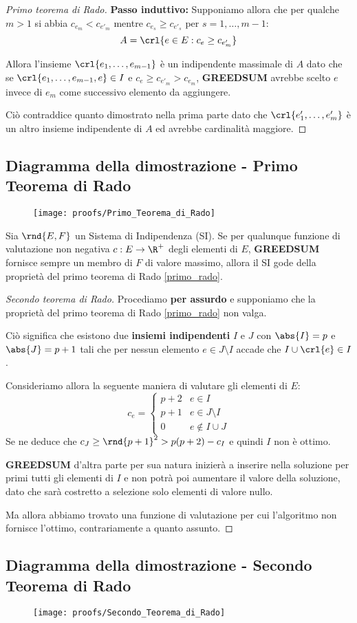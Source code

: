 \documentclass[\main/main.tex]{subfiles}
\begin{document}
\begin{proof}[Primo teorema di Rado]
  \textbf{Passo induttivo:} Supponiamo allora che per qualche \(m>1\) si abbia \(c_{e_m} < c_{e'_m}\) mentre \(c_{e_s} \geq c_{e'_s}\) per \(s = 1, \ldots, m-1\):
  \[A = \crl{e \in E: c_{e} \geq c_{e'_m}}\]

  Allora l'insieme \(\crl{e_1, \ldots, e_{m-1}}\) è un indipendente massimale di \(A\) dato che se \(\crl{e_1, \ldots, e_{m-1}, e} \in I\) e \(c_{e} \geq c_{e'_m} > c_{e_m}\), \textbf{GREEDSUM} avrebbe scelto \(e\) invece di \(e_m\) come successivo elemento da aggiungere.

  Ciò contraddice quanto dimostrato nella prima parte dato che \(\crl{e'_1, \ldots, e'_m}\) è un altro insieme indipendente di \(A\) ed avrebbe cardinalità maggiore.
\end{proof}
\clearpage
\subsection{Diagramma della dimostrazione - Primo Teorema di Rado}
\begin{figure}
  \texttt{[image: proofs/Primo\_Teorema\_di\_Rado]}
\end{figure}
\clearpage
\begin{theorem}
  Sia \(\rnd{E, F}\) un Sistema di Indipendenza (SI). Se per qualunque funzione di valutazione non negativa \(c: E \rightarrow \R^+\) degli elementi di \(E\), \textbf{GREEDSUM} fornisce sempre un membro di \(F\) di valore massimo, allora il SI gode della proprietà del primo teorema di Rado \ref{primo_rado}.
\end{theorem}
\begin{proof}[Secondo teorema di Rado]
  Procediamo \textbf{per assurdo} e supponiamo che la proprietà del primo teorema di Rado \ref{primo_rado} non valga.

  Ciò significa che esistono due \textbf{insiemi indipendenti} \(I\) e \(J\) con \(\abs{I} = p\) e \(\abs{J} = p+1\) tali che per nessun elemento \(e \in J \setminus I\) accade che \(I \cup \crl{e} \in I\).

  Consideriamo allora la seguente maniera di valutare gli elementi di \(E\):
  \[
    c_{e} = \begin{cases}
      p+2 & e \in I            \\
      p+1 & e \in J\setminus I \\
      0   & e \not\in I \cup J
    \end{cases}
  \]
  Se ne deduce che \(c_J \geq \rnd{p+1}^2 > p(p+2) - c_I\) e quindi \(I\) non è ottimo.

  \textbf{GREEDSUM} d'altra parte per sua natura inizierà a inserire nella soluzione per primi tutti gli elementi di \(I\) e non potrà poi aumentare il valore della soluzione, dato che sarà costretto a selezione solo elementi di valore nullo.

  Ma allora abbiamo trovato una funzione di valutazione per cui l'algoritmo non fornisce l'ottimo, contrariamente a quanto assunto.
\end{proof}
\clearpage
\subsection{Diagramma della dimostrazione - Secondo Teorema di Rado}
\begin{figure}
  \texttt{[image: proofs/Secondo\_Teorema\_di\_Rado]}
\end{figure}
\end{document}

